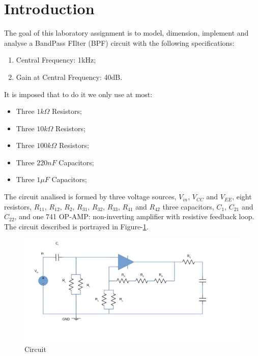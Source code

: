 \section{Introduction}
\label{sec:introduction}

\par The goal of this laboratory assignment is to model, dimension, implement and analyse a BandPass FIlter (BPF) circuit with the following specifications:
\begin{enumerate}
  \item Central Frequency: 1kHz;
  \item Gain at Central Frequency: 40dB.
\end{enumerate}

\par It is imposed that to do it we only use at most:
\begin{itemize}
  \item Three $1k\Omega$ Resistors;
  \item Three $10k\Omega$ Resistors;
  \item Three $100k\Omega$ Resistors;
  \item Three $220nF$ Capacitors;
  \item Three $1\mu F$ Capacitors;
\end{itemize}

\par The circuit analised is formed by three voltage sources, $V_{in}$, $V_{CC}$ and $V_{EE}$,
eight resistors, $R_{11}$, $R_{12}$, $R_{2}$, $R_{31}$, $R_{32}$, $R_{33}$, $R_{41}$ and $R_{42}$
three capacitors, $C_1$, $C_{21}$ and $C_{22}$, and one 741 OP-AMP: non-inverting amplifier
with resistive feedback loop. The circuit described
is portrayed in Figure-\ref{fig:circuit}.

\begin{figure}[h] \centering
  \includegraphics[width=1\linewidth]{circuit.pdf}
  \caption{Circuit}
  \label{fig:circuit}
\end{figure}



